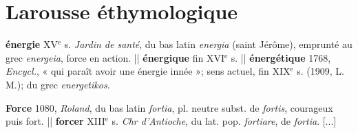 \section{Larousse éthymologique}
{\bf énergie }{\footnotesize XV}$^\text{e}$ s. {\it Jardin de santé}, du bas latin {\it energia} (saint Jérôme), emprunté au grec {\it energeia}, force en action. || {\bf énergique} fin {\footnotesize XVI}$^\text{e}$ s. || {\bf énergétique} 1768, {\it Encycl.}, « qui paraît avoir une énergie innée »; sens actuel, fin {\footnotesize XIX}$^\text{e}$ s. (1909, L. M.); du grec {\it energetikos}.

{\bf Force} 1080, {\it Roland}, du bas latin {\it fortia}, pl. neutre subst. de {\it fortis}, courageux puis fort. || {\bf forcer} {\footnotesize XIII}$^\text{e}$ s. {\it Chr d'Antioche}, du lat. pop. {\it fortiare}, de {\it fortia}. [...]%
